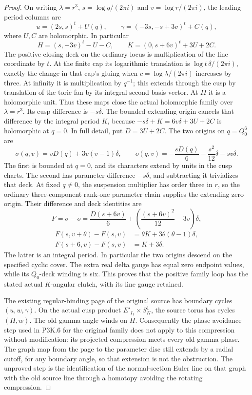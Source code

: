 \begin{proof}
On writing \(\lambda=r^3\), \(s=\log q/(2\pi i)\) and \(v=\log r/(2\pi i)\), the leading period columns are \[
 u=(2s,s)^t+U(q),\qquad
 \gamma=(-3s,-s+3v)^t+C(q),
\] where \(U,C\) are holomorphic. In particular \[
 H=(s,-3v)^t-U-C,\qquad
 K=(0,s+6v)^t+3U+2C.                             \tag{P3F.27.2}
\] The positive closing deck on the ordinary locus is multiplication of the line coordinate by \(t\). At the finite cap its logarithmic translation is \(\log t\,\delta/(2\pi i)\), exactly the change in that cap's gluing when \(c=\log\lambda/(2\pi i)\) increases by three. At infinity it is multiplication by \(q^{-1}\); this extends through the cusp by translation of the toric fan by its integral second basis vector. At \(II\) it is a holomorphic unit. Thus these maps close the actual holomorphic family over \(\lambda=r^3\). Its cusp difference is \(-s\delta\). The bounded extending origin cancels that difference by the integral period \(K\), because \(-s\delta+K=6v\delta+3U+2C\) is holomorphic at \(q=0\). In full detail, put \(D=3U+2C\). The two origins on \(q=Q_0^6\) are \[
 \sigma(q,v)=vD(q)+3v(v-1)\delta,
 \qquad
 o(q,v)=-\frac{sD(q)}6-\frac{s^2}{12}\delta-sv\delta.
\] The first is bounded at \(q=0\), and its characters extend by units in the cusp charts. The second has parameter difference \(-s\delta\), and subtracting it trivializes that deck. At fixed \(q\ne0\), the suspension multiplier has order three in \(r\), so the ordinary three-component rank-one parameter chain supplies the extending zero origin. Their difference and deck identities are \[
 F=\sigma-o=\frac{D(s+6v)}6+
       \left(\frac{(s+6v)^2}{12}-3v\right)\delta,
\] \[
 \begin{aligned}
 F(s,v+\theta)-F(s,v)&=\theta K+3\theta(\theta-1)\delta,\\
 F(s+6,v)-F(s,v)&=K+3\delta.
 \end{aligned}
\] The latter is an integral period. In particular the two origins descend on the specified cyclic cover. The extra real delta gauge has equal zero endpoint values, while its \(Q_0\)-deck winding is six. This proves that the positive family loop has the stated actual \(K\)-angular clutch, with its line gauge retained.

The existing regular-binding page of the original source has boundary cycles \((u,w,\gamma)\). On the actual cusp product \(E'_{I_1}\times S^1_K\), the source torus has cycles \((H,w)\). The old gamma angle winds on \(H\). Consequently the phase avoidance step used in P3K.6 for the original family does not apply to this compression without modification: its projected compression meets every old gamma phase. The graph map from the page to the parameter disc still extends by a radial cutoff, for any boundary angle, so that extension is not the obstruction. The unproved step is the identification of the normal-section Euler line on that graph with the old source line through a homotopy avoiding the rotating compression.


\end{proof}
